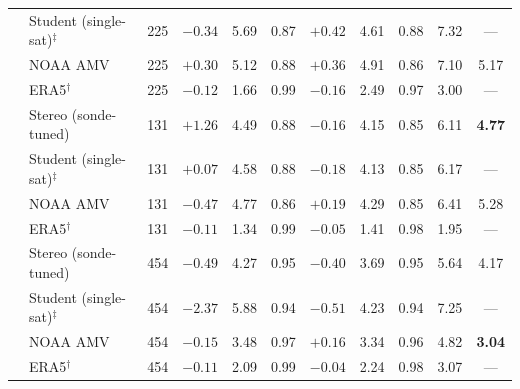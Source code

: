 \begin{table}[t]
\begin{tabular}{llrrrrrrrrc}
 & Student (single-sat)$^{\ddagger}$ & 225 & $-0.34$ & 5.69 & 0.87 & $+0.42$ & 4.61 & 0.88 & 7.32 & --- \\
 & NOAA AMV & 225 & $+0.30$ & 5.12 & 0.88 & $+0.36$ & 4.91 & 0.86 & 7.10 & 5.17 \\
 & ERA5$^{\dagger}$ & 225 & $-0.12$ & 1.66 & 0.99 & $-0.16$ & 2.49 & 0.97 & 3.00 & --- \\
\midrule
{} & Stereo (sonde-tuned) & 131 & $+1.26$ & 4.49 & 0.88 & $-0.16$ & 4.15 & 0.85 & 6.11 & \textbf{4.77} \\
 & Student (single-sat)$^{\ddagger}$ & 131 & $+0.07$ & 4.58 & 0.88 & $-0.18$ & 4.13 & 0.85 & 6.17 & --- \\
 & NOAA AMV & 131 & $-0.47$ & 4.77 & 0.86 & $+0.19$ & 4.29 & 0.85 & 6.41 & 5.28 \\
 & ERA5$^{\dagger}$ & 131 & $-0.11$ & 1.34 & 0.99 & $-0.05$ & 1.41 & 0.98 & 1.95 & --- \\
\midrule
{} & Stereo (sonde-tuned) & 454 & $-0.49$ & 4.27 & 0.95 & $-0.40$ & 3.69 & 0.95 & 5.64 & 4.17 \\
 & Student (single-sat)$^{\ddagger}$ & 454 & $-2.37$ & 5.88 & 0.94 & $-0.51$ & 4.23 & 0.94 & 7.25 & --- \\
 & NOAA AMV & 454 & $-0.15$ & 3.48 & 0.97 & $+0.16$ & 3.34 & 0.96 & 4.82 & \textbf{3.04} \\
 & ERA5$^{\dagger}$ & 454 & $-0.11$ & 2.09 & 0.99 & $-0.04$ & 2.24 & 0.98 & 3.07 & --- \\
\bottomrule
\end{tabular}
\end{table}
